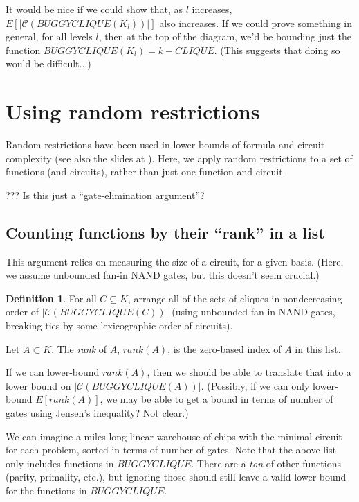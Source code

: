 \documentclass[12pt]{article}
\theoremstyle{definition}
\newtheorem{defn}{Definition}[section]
\newcommand{\bigC}[0]{\mathcal{C}}
\begin{document}
It would be nice if we could show that, as $l$ increases,
$E[|\bigC(BUGGYCLIQUE(K_l))|]$ also increases.
If we could prove something in general, for all levels $l$, then at
the top of the diagram, we'd be bounding just the function
$BUGGYCLIQUE(K_l) = k-CLIQUE$. (This suggests that doing so would
be difficult...)


\section{Using random restrictions}

Random restrictions have been used in lower bounds of formula
\cite{subbotovskaya1963comparison} and circuit \cite{hastad1987lower}
complexity (see also the slides at \cite{rossmanRestrictions}).
Here, we apply random restrictions to a set of functions (and circuits),
rather than just one function and circuit.

??? Is this just a ``gate-elimination argument''?

\subsection{Counting functions by their ``rank'' in a list}

This argument relies on measuring the size of a circuit,
for a given basis. (Here, we assume unbounded fan-in
NAND gates, but this doesn't seem crucial.)

\begin{defn}
\label{Rank}
For all $C \subseteq K$,
arrange all of the sets of cliques in nondecreasing order
of $|\bigC(BUGGYCLIQUE(C))|$ (using unbounded fan-in NAND gates,
breaking ties by some lexicographic order of circuits).

Let $A \subset K$. The {\em rank} of $A$, $rank(A)$, is the zero-based
index of $A$ in this list.
\end{defn}

If we can lower-bound $rank(A)$, then we should be able to translate
that into a
lower bound on $|\bigC(BUGGYCLIQUE(A))|$. (Possibly, if we
can only lower-bound $E[rank(A)]$, we may be able to get
a bound in terms of number of gates using Jensen's inequality?
Not clear.)

We can imagine a miles-long linear warehouse of chips with the minimal
circuit for each problem, sorted in terms of number of gates.
Note that the above list only includes functions in $BUGGYCLIQUE$.
There are a {\em ton} of other functions (parity, primality, etc.), but ignoring
those should still leave a valid lower bound for the functions in $BUGGYCLIQUE$.
\end{document}
